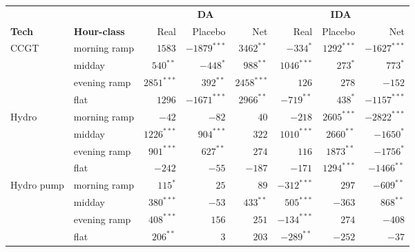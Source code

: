 \documentclass[11pt]{article}
\begin{document}
\begin{center}
\footnotesize
\setlength{\tabcolsep}{4pt}
\begin{tabular}{l l r r r r r r}
\toprule
                & & \multicolumn{3}{c}{\textbf{DA}} & \multicolumn{3}{c}{\textbf{IDA}} \\
\cmidrule(lr){3-5} \cmidrule(lr){6-8}
\textbf{Tech} & \textbf{Hour-class} & Real & Placebo & Net & Real & Placebo & Net \\
\midrule
CCGT        & morning ramp  & $1583$         & $-1879^{***}$  & $3462^{**}$   & $-334^{*}$    & $1292^{***}$  & $-1627^{***}$ \\
            & midday        & $540^{**}$     & $-448^{*}$     & $988^{**}$    & $1046^{***}$  & $273^{*}$     & $773^{*}$ \\
            & evening ramp  & $2851^{***}$   & $392^{**}$     & $2458^{***}$  & $126$         & $278$         & $-152$ \\
            & flat          & $1296$         & $-1671^{***}$  & $2966^{**}$   & $-719^{**}$   & $438^{*}$     & $-1157^{***}$ \\
\addlinespace
Hydro       & morning ramp  & $-42$          & $-82$          & $40$          & $-218$        & $2605^{***}$  & $-2822^{***}$ \\
            & midday        & $1226^{***}$   & $904^{***}$    & $322$         & $1010^{***}$  & $2660^{**}$   & $-1650^{*}$ \\
            & evening ramp  & $901^{***}$    & $627^{**}$     & $274$         & $116$         & $1873^{**}$   & $-1756^{*}$ \\
            & flat          & $-242$         & $-55$          & $-187$        & $-171$        & $1294^{***}$  & $-1466^{**}$ \\
\addlinespace
Hydro pump  & morning ramp  & $115^{*}$      & $25$           & $89$          & $-312^{***}$  & $297$         & $-609^{**}$ \\
            & midday        & $380^{***}$    & $-53$          & $433^{**}$    & $505^{***}$   & $-363$        & $868^{**}$ \\
            & evening ramp  & $408^{***}$    & $156$          & $251$         & $-134^{***}$  & $274$         & $-408$ \\
            & flat          & $206^{**}$     & $3$            & $203$         & $-289^{**}$   & $-252$        & $-37$ \\
\bottomrule
\end{tabular}
\label{tab:specB-da15}
\end{center}
\end{document}
